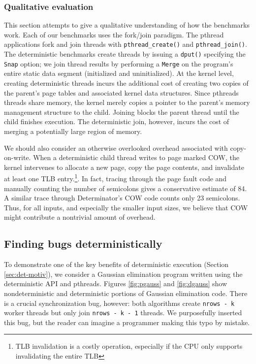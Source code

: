 \subsubsection{Qualitative evaluation}
This section attempts to give a qualitative understanding of how the benchmarks
work. Each of our benchmarks uses the fork/join paradigm. The pthread
applications fork and join threads with \mbox{\tt pthread\_create()} and
\mbox{\tt pthread\_join()}. The deterministic benchmarks create threads by
issuing a {\tt dput()} specifying the {\tt Snap} option; we join thread results
by performing a {\tt Merge} on the
program's entire static data segment (initialized and uninitialized). At the
kernel level, creating deterministic threads incurs the additional cost of
creating two copies of the parent's page tables and associated kernel data
structures. Since pthreads threads share memory, the kernel merely
copies a pointer to the parent's memory management structure to the child.
Joining blocks the parent thread until the child finishes execution. The
deterministic join, however, incurs the cost of merging a potentially large
region of memory.

We should also consider an otherwise overlooked overhead associated with
copy-on-write. When a deterministic child thread writes to page marked COW,
the kernel intervenes to allocate a new page, copy the page contents, and
invalidate at least one TLB entry.\footnote{TLB invalidation is a costly
operation, especially if the CPU only supports invalidating the entire TLB}.
In fact, tracing through the page fault code and manually counting the number of
semicolons gives a conservative estimate of 84. A similar trace through
Determinator's COW code counts only 23 semicolons.
Thus, for all inputs, and especially the smaller input sizes, we believe
that COW might contribute a nontrivial amount of overhead.

\subsection{Finding bugs deterministically}

To demonstrate one of the key benefits of deterministic execution (Section
\ref{sec:det-motiv}), we consider a Gaussian elimination program written using
the deterministic API and pthreads. Figures \ref{fig:pgauss} and
\ref{fig:dgauss} show nondeterministic and deterministic portions of Gaussian
elimination code. There is a crucial synchronization bug, however: both
algorithms create \mbox{\tt nrows - k} worker threads but only join
\mbox{\tt nrows - k - 1} threads. We purposefully inserted this bug, but the
reader can imagine a programmer making this typo by mistake.

